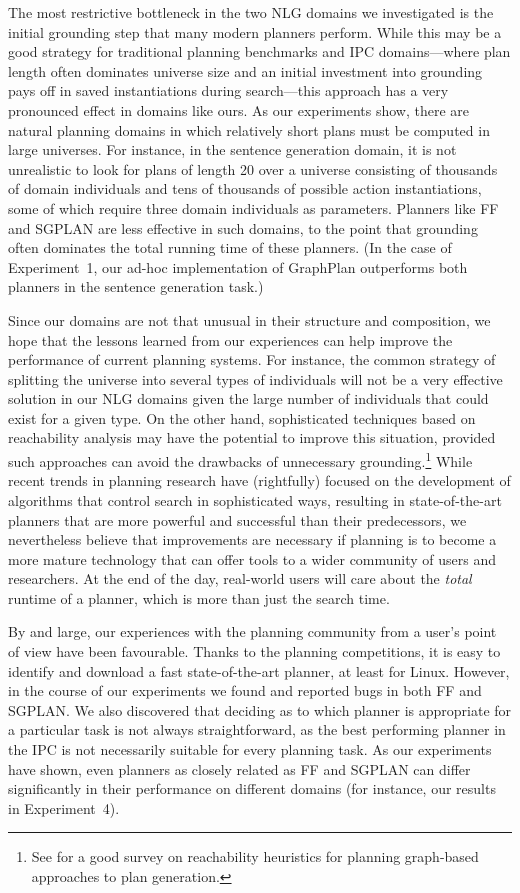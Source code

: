 \documentclass[letterpaper]{article}
\begin{document}
The most restrictive bottleneck in the two NLG domains we investigated is
the initial grounding step that many modern planners perform. While this
may be a good strategy for traditional planning benchmarks and IPC
domains---where plan length often dominates universe size and an initial
investment into grounding pays off in saved instantiations during
search---this approach has a very pronounced effect in domains like ours.
As our experiments show, there are natural planning domains in which
relatively short plans must be computed in large universes. For instance,
in the sentence generation domain, it is not unrealistic to look for plans
of length 20 over a universe consisting of thousands of domain individuals
and tens of thousands of possible action instantiations, some of which
require three domain individuals as parameters. Planners like FF and SGPLAN
are less effective in such domains, to the point that grounding
often dominates the total running time of these planners. (In the case of
Experiment~1, our ad-hoc implementation of GraphPlan outperforms both
planners in the sentence generation task.)

Since our domains are not that unusual in their structure and composition,
we hope that the lessons learned from our experiences can help improve the
performance of current planning systems. For instance, the common strategy
of splitting the universe into several types of individuals will not be a
very effective solution in our NLG domains given the large number of
individuals that could exist for a given type. On the other hand,
sophisticated techniques based on reachability analysis may have the
potential to improve this situation, provided such approaches can avoid the
drawbacks of unnecessary grounding.\footnote{See
  \citep{Bryce:07} for a good survey on reachability heuristics for planning
  graph-based approaches to plan generation.}
While recent trends in planning research have (rightfully) focused on the
development of algorithms that control search in sophisticated ways,
resulting in state-of-the-art planners that are more powerful and
successful than their predecessors, we nevertheless believe that
improvements are necessary if planning is to become a more mature
technology that can offer tools to a wider community of users and
researchers. At the end of the day, real-world users will care about the
\emph{total} runtime of a planner, which is more than just the search time.

By and large, our experiences with the planning community from a user's
point of view have been favourable. Thanks to the planning competitions, it
is easy to identify and download a fast state-of-the-art planner, at least
for Linux. However, in the course of our experiments we found and reported
bugs in both FF and SGPLAN. We also discovered that deciding as to which
planner is appropriate for a particular task is not always straightforward,
as the best performing planner in the IPC is not necessarily suitable for
every planning task. As our experiments have shown, even planners as
closely related as FF and SGPLAN can differ significantly in their
performance on different domains (for instance, our results in
Experiment~4).
\end{document}
